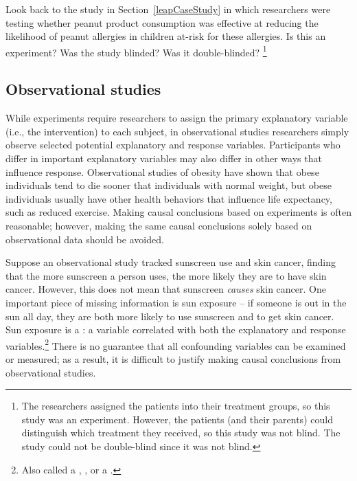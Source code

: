 \begin{doublespace}
\begin{exercise}
	Look back to the study in Section~\ref{leapCaseStudy} in which researchers were testing whether peanut product consumption was effective at reducing the likelihood of peanut allergies in children at-risk for these allergies. Is this an experiment? Was the study blinded? Was it double-blinded? \footnote{The researchers assigned the patients into their treatment groups, so this study was an experiment. However, the patients (and their parents) could distinguish which treatment they received, so this study was not blind. The study could not be double-blind since it was not blind.}
\end{exercise}

\subsection{Observational studies}

While experiments require researchers to assign the primary explanatory variable (i.e., the intervention) to each subject, in observational studies researchers simply observe selected potential explanatory and response variables. Participants who differ in important explanatory variables may also differ in other ways that influence response.  Observational studies of obesity have shown that obese individuals tend to die sooner that individuals with normal weight, but obese individuals usually have other health behaviors that influence life expectancy, such as reduced exercise. Making causal conclusions based on experiments is often reasonable; however, making the same causal conclusions solely based on observational data should be avoided. 

Suppose an observational study tracked sunscreen use and skin cancer, finding that the more sunscreen a person uses, the more likely they are to have skin cancer. However, this does not mean that sunscreen \emph{causes} skin cancer. One important piece of missing information is sun exposure -- if someone is out in the sun all day, they are both more likely to use sunscreen and to get skin cancer. Sun exposure is a  : a variable correlated with both the explanatory and response variables.\footnote{Also called a , , or a .} There is no guarantee that all confounding variables can be examined or measured; as a result, it is difficult to justify making causal conclusions from observational studies. 


\end{doublespace}
